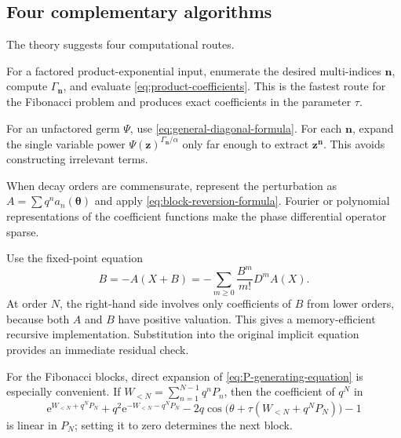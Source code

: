 \documentclass[11pt,oneside]{article}
\numberwithin{equation}{section}
\newcommand{\e}{\mathrm{e}}
\newcommand{\vct}[1]{\boldsymbol{#1}}
\begin{document}
\subsection{Four complementary algorithms}

The theory suggests four computational routes.

\begin{methodbox}
For a factored product-exponential input, enumerate the desired multi-indices
\(\vct n\), compute \(\Gamma_{\vct n}\), and evaluate
\cref{eq:product-coefficients}.  This is the fastest route for the Fibonacci
problem and produces exact coefficients in the parameter \(\tau\).
\end{methodbox}

\begin{methodbox}
For an unfactored germ \(\Psi\), use
\cref{eq:general-diagonal-formula}.  For each \(\vct n\), expand the single
variable power \(\Psi(\vct z)^{\Gamma_{\vct n}/\alpha}\) only far enough to
extract \(\vct z^{\vct n}\).  This avoids constructing irrelevant terms.
\end{methodbox}

\begin{methodbox}
When decay orders are commensurate, represent the perturbation as
\(A=\sum q^na_n(\vct\theta)\) and apply
\cref{eq:block-reversion-formula}.  Fourier or polynomial representations of
the coefficient functions make the phase differential operator sparse.
\end{methodbox}

\begin{methodbox}
Use the fixed-point equation
\begin{equation}
  B=-A(X+B)
   =-\sum_{m\ge0}\frac{B^m}{m!}D^mA(X).
  \label{eq:triangular-recurrence}
\end{equation}
At order \(N\), the right-hand side involves only coefficients of \(B\) from
lower orders, because both \(A\) and \(B\) have positive valuation.  This gives
a memory-efficient recursive implementation.  Substitution into the original
implicit equation provides an immediate residual check.
\end{methodbox}

For the Fibonacci blocks, direct expansion of
\cref{eq:P-generating-equation} is especially convenient.  If
\(W_{<N}=\sum_{n=1}^{N-1}q^nP_n\), then the coefficient of \(q^N\) in
\begin{equation}
  \e^{W_{<N}+q^NP_N}+q^2\e^{-W_{<N}-q^NP_N}
  -2q\cos\bigl(\theta+\tau(W_{<N}+q^NP_N)\bigr)-1
\end{equation}
is linear in \(P_N\); setting it to zero determines the next block.
\end{document}
